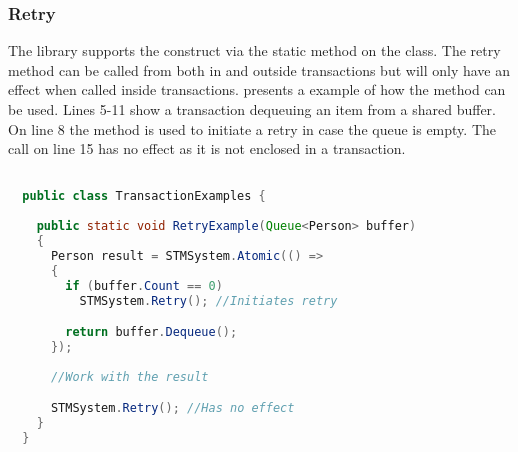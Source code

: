 \subsubsection{Retry}
The library supports the  construct via the static  method on the  class. The retry method can be called from both in and outside transactions but will only have an effect when called inside transactions.  presents a example of how the  method can be used. Lines 5-11 show a transaction dequeuing an item from a shared buffer. On line 8 the  method is used to initiate a retry in case the queue is empty. The call on line 15 has no effect as it is not enclosed in a transaction.

\begin{lstlisting}[label=lst:library_retry,
  caption={Library \bscode{Retry}},
  language=Java,  
  showspaces=false,
  showtabs=false,
  breaklines=true,
  showstringspaces=false,
  breakatwhitespace=true,
  commentstyle=\color{greencomments},
  keywordstyle=\color{bluekeywords},
  stringstyle=\color{redstrings},
  morekeywords={atomic, retry, orElse, var, get, set}]  % Start your code-block

  public class TransactionExamples {
    
    public static void RetryExample(Queue<Person> buffer)
    {
      Person result = STMSystem.Atomic(() =>
      {
        if (buffer.Count == 0)
          STMSystem.Retry(); //Initiates retry

        return buffer.Dequeue();
      });
      
      //Work with the result

      STMSystem.Retry(); //Has no effect
    }
  }
\end{lstlisting}
